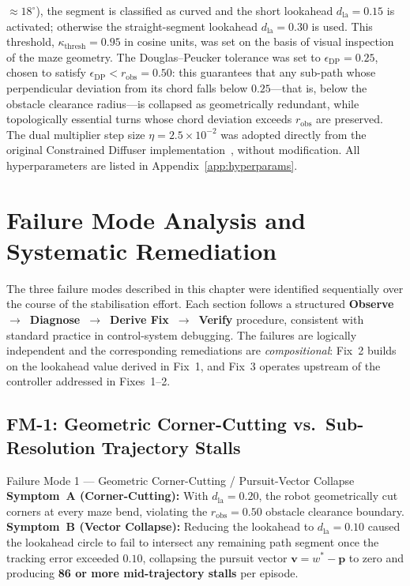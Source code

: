 \documentclass[12pt, a4paper, oneside]{report}
\theoremstyle{definition}
\newcommand{\dlookahead}{d_{\mathrm{la}}}
\begin{document}
$\approx 18^\circ$), the segment is classified as curved and the
short lookahead $\dlookahead = 0.15$ is activated; otherwise the
straight-segment lookahead $\dlookahead = 0.30$ is used. This
threshold, $\kappa_{\mathrm{thresh}} = 0.95$ in cosine units, was
set on the basis of visual inspection of the maze geometry. The
Douglas--Peucker tolerance was set to $\epsilon_{\mathrm{DP}} =
0.25$, chosen to satisfy $\epsilon_{\mathrm{DP}} < r_{\mathrm{obs}}
= 0.50$: this guarantees that any sub-path whose perpendicular
deviation from its chord falls below $0.25$---that is, below the
obstacle clearance radius---is collapsed as geometrically redundant,
while topologically essential turns whose chord deviation exceeds
$r_{\mathrm{obs}}$ are preserved. The dual multiplier step size
$\eta = 2.5\times10^{-2}$ was adopted directly from the original
Constrained Diffuser implementation~\citep{zhang2026constrained}, without modification. All
hyperparameters are listed in Appendix~\ref{app:hyperparams}.

\chapter{Failure Mode Analysis and Systematic Remediation}
\label{chap:failures}

The three failure modes described in this chapter were identified
sequentially over the course of the stabilisation effort. Each
section follows a structured
\textbf{Observe~$\to$~Diagnose~$\to$~Derive Fix~$\to$~Verify}
procedure, consistent with standard practice in control-system
debugging. The failures are logically independent and the
corresponding remediations are \emph{compositional}: Fix~2 builds
on the lookahead value derived in Fix~1, and Fix~3 operates upstream
of the controller addressed in Fixes~1--2.

\section{FM-1: Geometric Corner-Cutting vs.\ Sub-Resolution
         Trajectory Stalls}
\label{sec:fm1}

\begin{fmbox}{Failure Mode 1 — Geometric Corner-Cutting /
              Pursuit-Vector Collapse}
\textbf{Symptom~A (Corner-Cutting):}
With $\dlookahead = 0.20$, the robot geometrically cut corners
at every maze bend, violating the $r_{\mathrm{obs}} = 0.50$
obstacle clearance boundary.\\[4pt]
\textbf{Symptom~B (Vector Collapse):}
Reducing the lookahead to $\dlookahead = 0.10$ caused the
lookahead circle to fail to intersect any remaining path segment
once the tracking error exceeded $0.10$, collapsing the pursuit
vector $\mathbf{v} = w^* - \mathbf{p}$ to zero and producing
\textbf{86 or more mid-trajectory stalls} per episode.
\end{fmbox}
\end{document}
